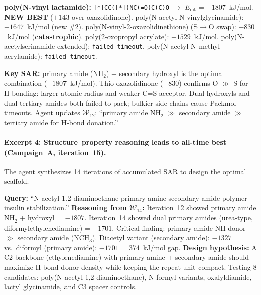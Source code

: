 \documentclass[twocolumn]{fairmeta}
\begin{document}
\begin{toolcall}
\scriptsize
\textbf{poly(N-vinyl lactamide):} \texttt{[*]CC([*])NC(=O)C(C)O} $\to$ $E_\text{int} = -1807$~kJ/mol. \textbf{NEW BEST} ($+143$ over oxazolidinone).
poly(N-acetyl-N-vinylglycinamide): $-1647$~kJ/mol (new \#2).
poly(N-vinyl-2-oxazolidinethione) (S$\to$O swap): $-830$~kJ/mol (\textbf{catastrophic}).
poly(2-oxopropyl acrylate): $-1529$~kJ/mol.
poly(N-acetylserinamide extended): \texttt{failed\_timeout}.
poly(N-acetyl-N-methyl acrylamide): \texttt{failed\_timeout}.
\end{toolcall}

\begin{observation}
\scriptsize
\textbf{Key SAR:} primary amide (NH$_2$) + secondary hydroxyl is the optimal combination ($-1807$~kJ/mol).
Thio-oxazolidinone ($-830$) confirms O $\gg$ S for H-bonding: larger atomic radius and weaker C=S acceptor.
Dual hydroxyls and dual tertiary amides both failed to pack; bulkier side chains cause Packmol timeouts.
Agent updates $\mathcal{W}_{12}$: ``primary amide NH$_2$ $\gg$ secondary amide $\gg$ tertiary amide for H-bond donation.''
\end{observation}

\paragraph{Excerpt 4: Structure--property reasoning leads to all-time best (Campaign~A, iteration~15).}
The agent synthesizes 14 iterations of accumulated SAR to design the optimal scaffold.

\begin{agentthought}
\scriptsize
\textbf{Query:} ``N-acetyl-1,2-diaminoethane primary amine secondary amide polymer insulin stabilization.''
\textbf{Reasoning from $\mathcal{W}_{14}$:}
Iteration~12 showed primary amide NH$_2$ + hydroxyl = $-1807$.
Iteration~14 showed dual primary amides (urea-type, diformylethylenediamine) = $-1701$.
Critical finding: primary amide NH donor $\gg$ secondary amide (NCH$_3$).
Diacetyl variant (secondary amide): $-1327$ vs.\ diformyl (primary amide): $-1701$ = 374~kJ/mol gap.
\textbf{Design hypothesis:} A C2 backbone (ethylenediamine) with primary amine + secondary amide should maximize H-bond donor density while keeping the repeat unit compact.
Testing 8 candidates: poly(N-acetyl-1,2-diaminoethane), N-formyl variants, oxalyldiamide, lactyl glycinamide, and C3 spacer controls.
\end{agentthought}
\end{document}

